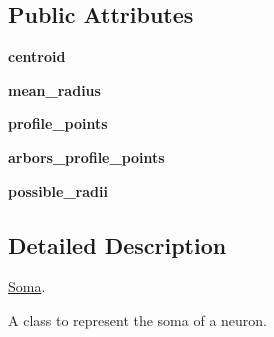 \subsection*{Public Attributes}
\begin{DoxyCompactItemize}
\item 
{\bfseries centroid}\hypertarget{classmeshy_1_1neuromorphovis_1_1morphologies_1_1__skeleton_1_1soma_1_1Soma_a91f2c1683611c52914165b1d38d79450}{}\label{classmeshy_1_1neuromorphovis_1_1morphologies_1_1__skeleton_1_1soma_1_1Soma_a91f2c1683611c52914165b1d38d79450}

\item 
{\bfseries mean\+\_\+radius}\hypertarget{classmeshy_1_1neuromorphovis_1_1morphologies_1_1__skeleton_1_1soma_1_1Soma_a2e456afed6da49043f0ea8d9864e6a82}{}\label{classmeshy_1_1neuromorphovis_1_1morphologies_1_1__skeleton_1_1soma_1_1Soma_a2e456afed6da49043f0ea8d9864e6a82}

\item 
{\bfseries profile\+\_\+points}\hypertarget{classmeshy_1_1neuromorphovis_1_1morphologies_1_1__skeleton_1_1soma_1_1Soma_a7e323d7cc984f2344780238535afbb94}{}\label{classmeshy_1_1neuromorphovis_1_1morphologies_1_1__skeleton_1_1soma_1_1Soma_a7e323d7cc984f2344780238535afbb94}

\item 
{\bfseries arbors\+\_\+profile\+\_\+points}\hypertarget{classmeshy_1_1neuromorphovis_1_1morphologies_1_1__skeleton_1_1soma_1_1Soma_acab51364a1345819797303823f183d19}{}\label{classmeshy_1_1neuromorphovis_1_1morphologies_1_1__skeleton_1_1soma_1_1Soma_acab51364a1345819797303823f183d19}

\item 
{\bfseries possible\+\_\+radii}\hypertarget{classmeshy_1_1neuromorphovis_1_1morphologies_1_1__skeleton_1_1soma_1_1Soma_ae7d3f6658ec08124e795ab09df9f254f}{}\label{classmeshy_1_1neuromorphovis_1_1morphologies_1_1__skeleton_1_1soma_1_1Soma_ae7d3f6658ec08124e795ab09df9f254f}

\end{DoxyCompactItemize}


\subsection{Detailed Description}
\hyperlink{classmeshy_1_1neuromorphovis_1_1morphologies_1_1__skeleton_1_1soma_1_1Soma}{Soma}. 

\begin{DoxyVerb}A class to represent the soma of a neuron. \end{DoxyVerb}
 

